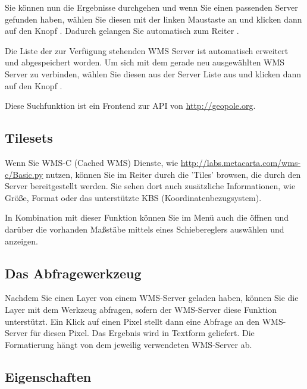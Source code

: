 Sie können nun die Ergebnisse durchgehen und wenn Sie einen passenden Server
gefunden haben, wählen Sie diesen mit der linken Maustaste an und klicken
dann auf den Knopf . Dadurch
gelangen Sie automatisch zum Reiter .

Die Liste der zur Verfügung stehenden WMS Server ist automatisch erweitert
und abgespeichert worden. Um sich mit dem gerade neu ausgewählten WMS Server
zu verbinden, wählen Sie diesen aus der Server Liste aus und klicken dann auf
den Knopf .

Diese Suchfunktion ist ein Frontend zur API von \url{http://geopole.org}.

\subsection{Tilesets}\label{sec:tilesets}

Wenn Sie WMS-C (Cached WMS) Dienste, wie \url{http://labs.metacarta.com/wms-c/Basic.py} 
nutzen, können Sie im Reiter  durch die 'Tiles' browsen, die durch den 
Server bereitgestellt werden. Sie sehen dort auch zusätzliche Informationen, wie 
Größe, Format oder das unterstützte KBS (Koordinatenbezugsystem).

In Kombination mit dieser Funktion können Sie im Menü  auch 
die  öffnen und darüber die vorhanden Maßstäbe 
mittels eines Schiebereglers auswählen und anzeigen. 

\subsection{Das Abfragewerkzeug}\label{sec:ogc-wms-identify}

Nachdem Sie einen Layer von einem WMS-Server geladen haben, können Sie
die Layer mit dem Werkzeug 
abfragen, sofern der WMS-Server diese Funktion unterstützt. Ein Klick auf
einen Pixel stellt dann eine Abfrage an den WMS-Server für diesen Pixel.
Das Ergebnis wird in Textform geliefert. Die Formatierung hängt von dem
jeweilig verwendeten WMS-Server ab.

\subsection{Eigenschaften}\label{sec:ogc-wms-properties}

